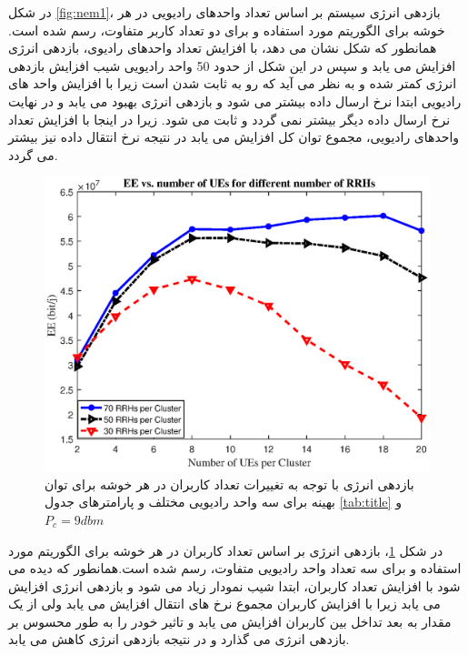  در شکل \ref{fig:nem1}، بازدهی انرژی سیستم  بر اساس تعداد واحدهای رادیویی در هر خوشه برای الگوریتم مورد استفاده و برای دو تعداد کاربر متفاوت، رسم شده است. 
 همانطور که  شکل  نشان می دهد، با افزایش تعداد واحدهای رادیوی، بازدهی انرژی افزایش می یابد و سپس  در این شکل از حدود 50 واحد رادیویی شیب افزایش بازدهی انرژی کمتر شده و به نظر می آید که رو به ثابت شدن است زیرا با افزایش واحد های رادیویی ابتدا نرخ ارسال داده بیشتر می شود و بازدهی انرژی بهبود می یابد و در نهایت نرخ ارسال داده دیگر بیشتر نمی گردد و ثابت می شود. زیرا در اینجا با افزایش تعداد واحدهای رادیویی، مجموع توان کل افزایش می یابد در نتیجه نرخ انتقال داده نیز بیشتر می گردد.

  \begin{figure}[h]
  \centering
    \includegraphics[width=\linewidth]{./fig3/ueEnd}
  \caption{  بازدهی انرژی با توجه به تغییرات تعداد کاربران در هر خوشه برای توان بهینه  برای 
   سه واحد رادیویی مختلف
   و پارامترهای جدول \ref{tab:title} و $P_c = 9dbm$}
  \label{fig:nem2}
\end{figure}


در شکل \ref{fig:nem2}، بازدهی انرژی بر اساس تعداد کاربران در هر خوشه برای الگوریتم مورد استفاده و برای سه تعداد واحد رادیویی متفاوت، رسم شده است.همانطور که  دیده می شود با افزایش تعداد کاربران، ابتدا شیب نمودار زیاد می شود و بازدهی انرژی افزایش می یابد زیرا با افزایش کاربران مجموع نرخ های انتقال افزایش می یابد ولی از یک مقدار به بعد تداخل بین کاربران افزایش می یابد و تاثیر خودر را به طور محسوس بر بازدهی انرژی می گذارد و در نتیجه بازدهی انرژی کاهش می یابد. 

